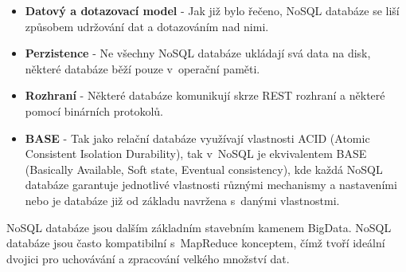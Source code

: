\begin{itemize}
\item \textbf{Datový a dotazovací model} - Jak již bylo řečeno, NoSQL databáze se liší způsobem udržování dat a dotazováním nad nimi.
\item \textbf{Perzistence} - Ne všechny NoSQL databáze ukládají svá data na disk, některé databáze běží pouze v~operační paměti.
\item \textbf{Rozhraní} - Některé databáze komunikují skrze REST rozhraní a některé pomocí binárních protokolů. 
\item \textbf{BASE} - Tak jako relační databáze využívají vlastnosti ACID (Atomic Consistent Isolation Durability), tak v~NoSQL je ekvivalentem BASE (Basically Available, Soft state, Eventual consistency), kde každá NoSQL databáze garantuje jednotlivé vlastnosti různými mechanismy a nastaveními nebo je databáze již od základu navržena s~danými vlastnostmi.   
\end{itemize}


NoSQL databáze jsou dalším základním stavebním kamenem BigData. NoSQL databáze jsou často kompatibilní s~MapReduce konceptem, čímž tvoří ideální dvojici pro uchovávání a zpracování velkého množství dat. 

